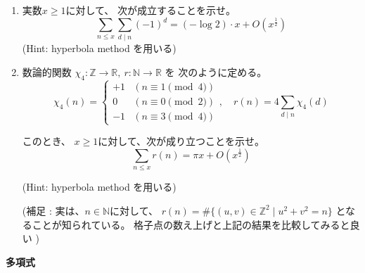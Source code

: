 \documentclass[12pt,b5paper]{ltjsarticle}
\begin{document}
\begin{enumerate}
\begin{enumerate}
            \dotfill

            \hrulefill


      \end{enumerate}


 \item
      実数$x\geq 1$に対して、
      次が成立することを示せ。
      \begin{equation}
       \sum_{n\leq x} \sum_{d \mid n}(-1)^{d}
        = (-\log{2})\cdot x + O(x^{\frac{1}{2}})
      \end{equation}
      (Hint: hyperbola method を用いる)


      \dotfill

      \hrulefill


 \item
      数論的関数
      $\chi_{4} : \mathbb{Z}\to\mathbb{R}
      ,\ 
      r:\mathbb{N}\to\mathbb{R}$
      を
      次のように定める。
      \begin{equation}
       \chi_{4}(n) =
        \begin{cases}
         +1 & ( n\equiv 1 \pmod{4})\\
         0 & ( n\equiv 0 \pmod{2})\\
         -1 & ( n\equiv 3 \pmod{4})
        \end{cases}
        ,\quad
        r(n)=4\sum_{d\mid n} \chi_{4}(d)
      \end{equation}

      このとき、
      $x\geq 1$に対して、次が成り立つことを示せ。
      \begin{equation}
       \sum_{n\leq x} r(n) = \pi x + O(x^{\frac{1}{2}})
      \end{equation}

      (Hint: hyperbola method を用いる)

      (補足 :
      実は、$n\in\mathbb{N}$に対して、
      $r(n) = \# \{ (u,v) \in\mathbb{Z}^2 \mid u^2+v^2=n \}$
      となることが知られている。
      格子点の数え上げと上記の結果を比較してみると良い
      )



      \dotfill

      \hrulefill




\end{enumerate}

\hrulefill

\newpage


\hrulefill

\textbf{ 多項式}
\end{document}
